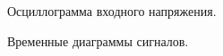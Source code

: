 \documentclass[spec, och, otchet, hidelinks]{SCWorks}
\begin{document}
\begin{figure}[h]
	\caption{Осциллограмма входного напряжения.}
\end{figure}

\begin{figure}[h!]
	\caption{Временные диаграммы сигналов.}
\end{figure}
\end{document}
